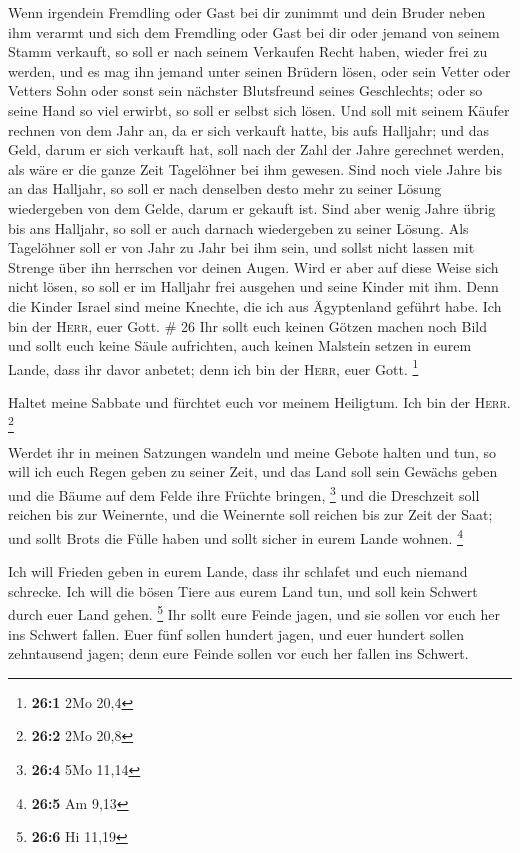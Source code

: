  Wenn irgendein Fremdling oder Gast bei dir zunimmt und
dein Bruder neben ihm verarmt und sich dem Fremdling oder Gast bei dir
oder jemand von seinem Stamm verkauft,  so soll er nach
seinem Verkaufen Recht haben, wieder frei zu werden, und es mag ihn
jemand unter seinen Brüdern lösen,  oder sein Vetter oder
Vetters Sohn oder sonst sein nächster Blutsfreund seines Geschlechts;
oder so seine Hand so viel erwirbt, so soll er selbst sich lösen.
 Und soll mit seinem Käufer rechnen von dem Jahr an, da
er sich verkauft hatte, bis aufs Halljahr; und das Geld, darum er sich
verkauft hat, soll nach der Zahl der Jahre gerechnet werden, als wäre er
die ganze Zeit Tagelöhner bei ihm gewesen.  Sind noch
viele Jahre bis an das Halljahr, so soll er nach denselben desto mehr zu
seiner Lösung wiedergeben von dem Gelde, darum er gekauft ist.
 Sind aber wenig Jahre übrig bis ans Halljahr, so soll er
auch darnach wiedergeben zu seiner Lösung.  Als
Tagelöhner soll er von Jahr zu Jahr bei ihm sein, und sollst nicht
lassen mit Strenge über ihn herrschen vor deinen Augen. 
Wird er aber auf diese Weise sich nicht lösen, so soll er im Halljahr
frei ausgehen und seine Kinder mit ihm.  Denn die Kinder
Israel sind meine Knechte, die ich aus Ägyptenland geführt habe. Ich bin
der \textsc{Herr}, euer Gott. \# 26  Ihr sollt euch keinen
Götzen machen noch Bild und sollt euch keine Säule aufrichten, auch
keinen Malstein setzen in eurem Lande, dass ihr davor anbetet; denn ich
bin der \textsc{Herr}, euer Gott. \footnote{\textbf{26:1} 2Mo 20,4}

 Haltet meine Sabbate und fürchtet euch vor meinem
Heiligtum. Ich bin der \textsc{Herr}. \footnote{\textbf{26:2} 2Mo 20,8}

 Werdet ihr in meinen Satzungen wandeln und meine Gebote
halten und tun,  so will ich euch Regen geben zu seiner
Zeit, und das Land soll sein Gewächs geben und die Bäume auf dem Felde
ihre Früchte bringen, \footnote{\textbf{26:4} 5Mo 11,14} 
und die Dreschzeit soll reichen bis zur Weinernte, und die Weinernte
soll reichen bis zur Zeit der Saat; und sollt Brots die Fülle haben und
sollt sicher in eurem Lande wohnen. \footnote{\textbf{26:5} Am 9,13}

 Ich will Frieden geben in eurem Lande, dass ihr schlafet
und euch niemand schrecke. Ich will die bösen Tiere aus eurem Land tun,
und soll kein Schwert durch euer Land gehen. \footnote{\textbf{26:6} Hi
  11,19}  Ihr sollt eure Feinde jagen, und sie sollen vor
euch her ins Schwert fallen.  Euer fünf sollen hundert
jagen, und euer hundert sollen zehntausend jagen; denn eure Feinde
sollen vor euch her fallen ins Schwert.

